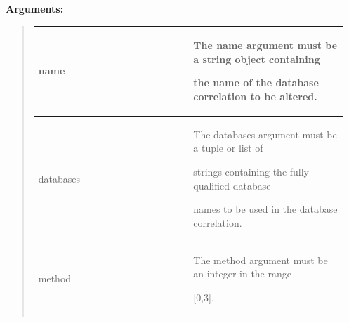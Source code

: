 \documentclass[letterpaper,10pt,english]{sphinxmanual}
\begin{document}
\begin{DUlineblock}{0em}
\item[] 
\item[] \textbf{Arguments:}
\end{DUlineblock}
\begin{quote}

\begin{tabular}{|p{0.475\linewidth}|p{0.475\linewidth}|}
\hline

name
 & 
\begin{DUlineblock}{0em}
\item[] The name argument must be a string object containing
\item[] the name of the database correlation to be altered.
\end{DUlineblock}
\\
\hline
databases
 & 
\begin{DUlineblock}{0em}
\item[] The databases argument must be a tuple or list of
\item[] strings containing the fully qualified database
\item[] names to be used in the database correlation.
\end{DUlineblock}
\\
\hline
method
 & 
\begin{DUlineblock}{0em}
\item[] The method argument must be an integer in the range
\item[] {[}0,3{]}.
\end{DUlineblock}
\\
\hline\end{tabular}

\end{quote}
\end{document}
